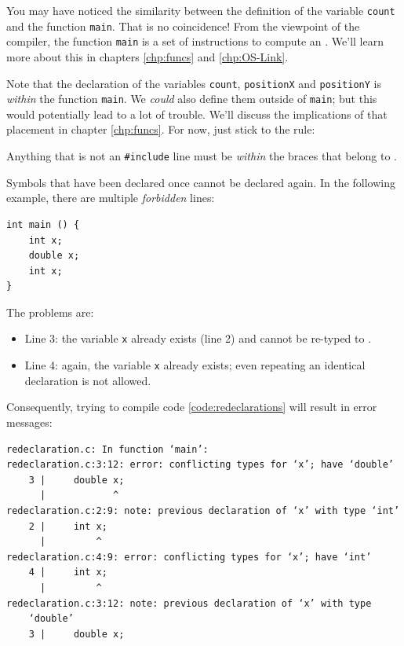 You may have noticed the similarity between the definition of the variable \texttt{count} and the function \texttt{main}. That is no coincidence! From the viewpoint of the compiler, the function \texttt{main} is a set of instructions to compute an . We'll learn more about this in chapters \ref{chp:funcs} and \ref{chp:OS-Link}.

\begin{warnbox}
Note that the declaration of the variables \texttt{count}, \texttt{positionX} and \texttt{positionY} is \emph{within} the function \texttt{main}. We \emph{could} also define them outside of \texttt{main}; but this would potentially lead to a lot of trouble. We'll discuss the implications of that placement in chapter \ref{chp:funcs}. For now, just stick to the rule:

Anything that is not an \texttt{\#include} line must be \emph{within} the braces that belong to .
\end{warnbox}

\begin{warnbox}
Symbols that have been declared once cannot be declared again. In the following example, there are multiple \emph{forbidden} lines:
\begin{codebox}[redeclaration.c]
\begin{verbatim}
int main () {
    int x;
    double x;
    int x;
}
\end{verbatim}
 \label{code:redeclarations}
\end{codebox}
The problems are: \vspace{-6pt}
\begin{itemize}
\setlength\itemsep{-3pt}
\item Line 3: the variable \texttt{x} already exists (line 2) and cannot be re-typed to .
\item Line 4: again, the variable \texttt{x} already exists; even repeating an identical declaration is not allowed.
\end{itemize}

Consequently, trying to compile code \ref{code:redeclarations} will result in error messages:
\begin{cmdbox}
\begin{verbatim}
redeclaration.c: In function ‘main’:
redeclaration.c:3:12: error: conflicting types for ‘x’; have ‘double’
    3 |     double x;
      |            ^
redeclaration.c:2:9: note: previous declaration of ‘x’ with type ‘int’
    2 |     int x;
      |         ^
redeclaration.c:4:9: error: conflicting types for ‘x’; have ‘int’
    4 |     int x;
      |         ^
redeclaration.c:3:12: note: previous declaration of ‘x’ with type
    ‘double’
    3 |     double x;
\end{verbatim}
\end{cmdbox}
\end{warnbox}

